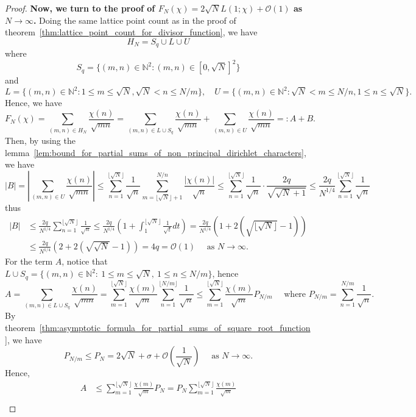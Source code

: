 \documentclass{elegantbook}
\begin{document}
\begin{proof}
  \noindent
  \textbf{Now, we turn to the proof of \(F_N(\chi) = 2\sqrt{N}L(1;\chi) + \mathcal{O}(1)\) as \(N \to \infty\).} Doing the same lattice point count as in the proof of theorem~\ref{thm:lattice_point_count_for_divisor_function}, we have
  \[
    H_N = S_q \cup L \cup U
  \]
  where
  \[
    S_q = \{ (m,n)\in \mathbb{N}^2 : (m,n) \in [0,\sqrt{N}]^2 \}
  \]
  and
  \[
    L = \{ (m,n)\in \mathbb{N}^2 : 1 \leq m \leq \sqrt{N}, \sqrt{N} < n \leq N/m \}, \quad U = \{ (m,n)\in \mathbb{N}^2 : \sqrt{N} < m \leq N/n, 1 \leq n \leq \sqrt{N} \}.
  \]
  Hence, we have
  \[
    F_{N}(\chi) = \sum_{(m,n)\in H_N} \frac{\chi(n)}{\sqrt{mn}} = \sum_{(m,n)\in L\cup S_q} \frac{\chi(n)}{\sqrt{mn}} + \sum_{(m,n)\in U} \frac{\chi(n)}{\sqrt{mn}} =: A + B.
  \]
  Then, by using the lemma~\ref{lem:bound_for_partial_sums_of_non_principal_dirichlet_characters}, we have
  \[
    |B| = \left| \sum_{(m,n)\in U} \frac{\chi(n)}{\sqrt{mn}} \right| \leq \sum_{n=1}^{\lfloor \sqrt{N} \rfloor} \frac{1}{\sqrt{n}} \sum_{m=\lfloor \sqrt{N} \rfloor + 1}^{N/n} \frac{|\chi(n)|}{\sqrt{n}} \leq \sum_{n=1}^{\lfloor \sqrt{N} \rfloor} \frac{1}{\sqrt{n}} \cdot \frac{2q}{\sqrt{\sqrt{N}+1}} \leq \frac{2q}{N^{1/4}} \sum_{n=1}^{\lfloor \sqrt{N} \rfloor} \frac{1}{\sqrt{n}}
  \]
  thus
  \[
  \begin{aligned}
    |B| &\leq \frac{2q}{N^{1/4}} \sum_{n=1}^{\lfloor \sqrt{N} \rfloor} \frac{1}{\sqrt{n}} \leq \frac{2q}{N^{1/4}}\left(1 + \int_{1}^{\lfloor \sqrt{N} \rfloor} \frac{1}{\sqrt{t}} dt \right) = \frac{2q}{N^{1/4}} \left(1 + 2(\sqrt{\lfloor \sqrt{N} \rfloor} - 1) \right) \\
    &\leq \frac{2q}{N^{1/4}} \left(2 + 2(\sqrt{\sqrt{N}} - 1) \right) = 4q=\mathcal{O}(1) \quad \text{ as } N \to \infty.
  \end{aligned}
  \]
  For the term \(A\), notice that $L\cup S_q = \{(m,n)\in\mathbb{N}^2:\ 1\le m\le \sqrt{N},\ 1\le n\le N/m\}$, hence
  \[
    A = \sum_{(m,n)\in L\cup S_q} \frac{\chi(n)}{\sqrt{mn}} = \sum_{m=1}^{\lfloor \sqrt{N} \rfloor} \frac{\chi(m)}{\sqrt{m}} \sum_{n=1}^{\lfloor N/m \rfloor} \frac{1}{\sqrt{n}} \leq \sum_{m=1}^{\lfloor \sqrt{N} \rfloor} \frac{\chi(m)}{\sqrt{m}} P_{N/m} \quad \text{ where } P_{N/m} = \sum_{n=1}^{N/m} \frac{1}{\sqrt{n}}.
  \]
  By theorem~\ref{thm:asymptotic_formula_for_partial_sums_of_square_root_function}, we have
  \[
    P_{N/m} \leq P_{N} = 2\sqrt{N} + \sigma + \mathcal{O}\left( \frac{1}{\sqrt{N}} \right) \quad \text{ as } N \to \infty.
  \]
  Hence,
  \[
  \begin{aligned}
    A &\leq \sum_{m=1}^{\lfloor \sqrt{N} \rfloor} \frac{\chi(m)}{\sqrt{m}} P_{N} = P_{N} \sum_{m=1}^{\lfloor \sqrt{N} \rfloor} \frac{\chi(m)}{\sqrt{m}} \\

\end{aligned}\]
\end{proof}
\end{document}
